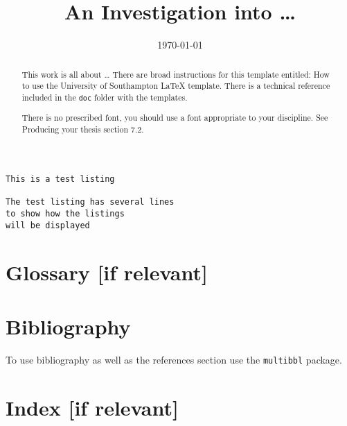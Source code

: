 \documentclass[sotoncolour]{uosminithesis}  %
\title      {An Investigation into \dots}
\date       {\today}
\begin{document}
\frontmatter
\maketitle
\begin{abstract}
This work is all about \dots
There are broad instructions for this template entitled: How to use the University of Southampton LaTeX template. There is a technical reference included in the \texttt{doc} folder with the templates.

There is no prescribed font, you should use a font appropriate to your discipline.  See Producing your thesis section 7.2.
\end{abstract}
\tableofcontents
\listoffigures
\listoftables
\lstlistoflistings
\listofaddmaterial
{}
\mainmatter


\begin{lstlisting}[caption=Listing of what an example listing would be like]
This is a test listing

The test listing has several lines
to show how the listings
will be displayed
\end{lstlisting}
\appendix

\backmatter
\chapter{Glossary [if relevant]}


\chapter{Bibliography}
To use bibliography as well as the references section use the \texttt{multibbl} package.
\chapter{Index [if relevant]}
\end{document}

